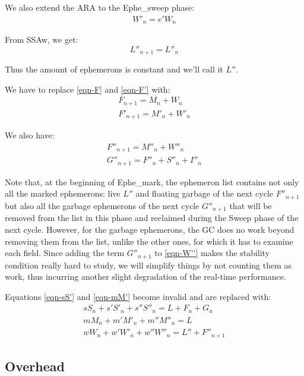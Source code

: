 \documentclass{article}
\begin{document}
We also extend the ARA to the Ephe\_sweep phase:
\begin{gather}
W'_n = e'W_n  \label{eqn-W'}
\end{gather}

From SSAw, we get:
\begin{equation}
L''_{n+1} = L''_n
\end{equation}

Thus the amount of ephemerons is constant and we'll call it $L''$.

We have to replace \eqref{eqn-F} and \eqref{eqn-F'} with:
\begin{gather}
F_{n+1} = M_n + W_n  \label{eqn-FW} \\
F'_{n+1} = M'_n + W'_n  \label{eqn-F'W}
\end{gather}

We also have:
\begin{gather}
F''_{n+1} = M''_n + W''_n  \label{eqn-F''} \\
G''_{n+1} = F''_n + S''_n + I''_n   \label{eqn-G''}
\end{gather}

Note that,
at the beginning of Ephe\_mark, the ephemeron list contains not only
all the marked ephemerons: live $L''$ and floating garbage of the next
cycle $F''_{n+1}$ but also all the garbage ephemerons of the next
cycle $G''_{n+1}$ that will be removed from the list in this phase
and reclaimed
during the Sweep phase of the next cycle. However, for the garbage
ephemerons, the GC does no work beyond removing them from the list,
unlike the other ones, for which it has to examine each field. Since
adding the term $G''_{n+1}$ to \eqref{eqn-W''} makes the stability
condition really hard
to study, we will simplify things by not counting them as work, thus
incurring another slight degradation of the real-time performance.

Equations
\eqref{eqn-sS'} and \eqref{eqn-mM'} become invalid and are replaced with:
\begin{gather}
sS_n + s'S'_n + s''S''_n = L + F_n + G_n \label{eqn-sS''}  \\
mM_n + m'M'_n + m''M''_n = L  \label{eqn-mM''} \\
wW_n + w'W'_n + w''W''_n = L'' + F''_{n+1}  \label{eqn-wW''}
\end{gather}


\subsection{Overhead}
\end{document}

